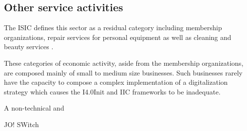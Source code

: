 \subsection{Other service activities}
The \ac{ISIC} defines this sector as a residual category including membership organizations, repair services for personal equipment as well as cleaning and beauty services \cite[p.262ff.]{ISIC:2008}. 

These categories of economic activity, aside from the membership organizations, are composed mainly of small to medium size businesses. Such businesses rarely have the capacity to compose a complex implementation of a digitalization strategy which causes the \ac{I4.0Init} and \ac{IIC} frameworks to be inadequate. 

A non-technical and 

JO! SWitch